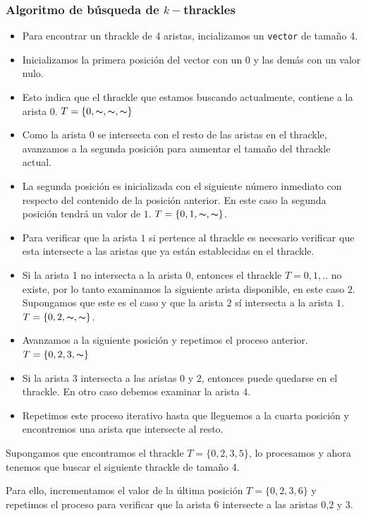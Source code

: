 \begin{frame}\frametitle{Algoritmo de búsqueda de $k-$thrackles}
\begin{itemize}
	\item Para encontrar un thrackle de 4 aristas, incializamos un \texttt{vector} de tamaño 4. \pause
	\item Inicializamos la primera posición del vector con un $0$ y las demás con un valor nulo. \item Esto indica que el thrackle que estamos buscando actualmente, contiene a la arista $0$. $T=\{0,\thicksim,\thicksim,\thicksim\}$
	 \item Como la arista $0$ se intersecta con el resto de las aristas en el thrackle, avanzamos a la segunda posición para aumentar el tamaño del thrackle actual. 
	 \pause\item La segunda posición es inicializada con el siguiente número inmediato con respecto del contenido de la posición anterior. En este caso la segunda posición tendrá un valor de $1$. $T=\{0,1,\thicksim,\thicksim\}$.
	 \item Para verificar que la arista $1$ si pertence al thrackle es necesario verificar que esta intersecte a las aristas que ya están establecidas en el thrackle.
\end{itemize}
\end{frame}
\begin{frame}
\begin{itemize}
	\item Si la arista 1 no intersecta a la arista 0, entonces el thrackle $T={0,1,..}$ no existe, por lo tanto examinamos la siguiente arista disponible, en este caso $2$. 
	Supongamos que este es el caso y que la arista $2$ sí intersecta a la arista $1$. $T=\{0,2,\thicksim,\thicksim\}$.
	\item Avanzamos a la siguiente posición y repetimos el proceso anterior. $T=\{0,2,3,\thicksim\}$
	\item Si la arista $3$ intersecta a las aristas $0$ y $2$, entonces puede quedarse en el thrackle. En otro caso debemos examinar la arista $4$. 
	\item Repetimos este proceso iterativo hasta que lleguemos a la cuarta posición y encontremos una arista que intersecte al resto.
\end{itemize}
Supongamos que encontramos el thrackle $T=\{0,2,3,5\}$, lo procesamos y ahora tenemos que buscar el siguiente thrackle de tamaño 4. \pause 

Para ello, incrementamos el valor de la última posición $T=\{0,2,3,6\}$ y repetimos el proceso para verificar que la arista $6$ intersecte a las aristas $0$,$2$ y $3$.
\end{frame}
